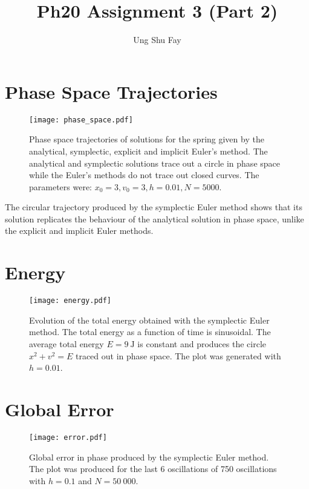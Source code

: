 \documentclass{article}
\title{Ph20 Assignment 3 (Part 2)}
\author{Ung Shu Fay}
\begin{document}
\maketitle

\section{Phase Space Trajectories}
    \begin{figure}[h!]
        \centering
        \texttt{[image: phase\_space.pdf]}
        \caption
        {
            Phase space trajectories of solutions for the spring given by the analytical, symplectic, explicit and implicit Euler's method. The analytical and symplectic solutions trace out a circle in phase space while the Euler's methods do not trace out closed curves. The parameters were: $x_0 = 3, v_0 = 3, h = 0.01, N = 5000$.
        }
        \label{phase}
    \end{figure}
    
    The circular trajectory produced by the symplectic Euler method shows that its solution replicates the behaviour of the analytical solution in phase space, unlike the explicit and implicit Euler methods. 
    
\break
\section{Energy}
    \begin{figure}[h!]
        \centering
        \texttt{[image: energy.pdf]}
        \caption
        {
            Evolution of the total energy obtained with the symplectic Euler method. The total energy as a function of time is sinusoidal. The average total energy $E= 9 \ \mathrm{J}$ is constant and produces the circle $x^2 + v^2 = E$ traced out in phase space. The plot was generated with $h = 0.01$.
        }
        \label{energy}
    \end{figure}

\section{Global Error}
    \begin{figure}[h!]
        \centering
        \texttt{[image: error.pdf]}
        \caption
        {
            Global error in phase produced by the symplectic Euler method. The plot was produced for the last 6 oscillations of 750 oscillations with $h = 0.1$ and $N = 50 \ 000$.
        }
        \label{fig:my_label}
    \end{figure}
\end{document}
